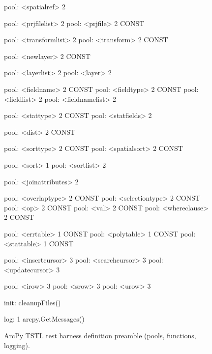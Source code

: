 \begin{figure}
{\begin{code}
pool: <spatialref> 2

pool: <prjfilelist> 2
pool: <prjfile> 2 CONST

pool: <transformlist> 2
pool: <transform> 2 CONST

pool: <newlayer> 2 CONST

pool: <layerlist> 2
pool: <layer> 2

pool: <fieldname> 2 CONST
pool: <fieldtype> 2 CONST
pool: <fieldlist> 2
pool: <fieldnamelist> 2

pool: <stattype> 2 CONST
pool: <statfields> 2

pool: <dist> 2 CONST

pool: <sorttype> 2 CONST
pool: <spatialsort> 2 CONST

pool: <sort> 1
pool: <sortlist> 2

pool: <joinattributes> 2

pool: <overlaptype> 2 CONST
pool: <selectiontype> 2 CONST
pool: <op> 2 CONST
pool: <val> 2 CONST
pool: <whereclause> 2 CONST

pool: <errtable> 1 CONST
pool: <polytable> 1 CONST
pool: <stattable> 1 CONST

pool: <insertcursor> 3
pool: <searchcursor> 3
pool: <updatecursor> 3

pool: <irow> 3
pool: <srow> 3
pool: <urow> 3

init: cleanupFiles()

log: 1 arcpy.GetMessages()
\end{code}
}
\caption{ArcPy TSTL test harness definition preamble (pools, functions, logging).}
\end{figure}

